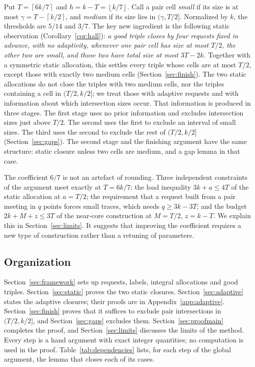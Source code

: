 \documentclass[11pt]{article}
\numberwithin{equation}{section}
\theoremstyle{definition}
\theoremstyle{remark}
\newcommand{\ceil}[1]{\left\lceil #1\right\rceil}
\newcommand{\floor}[1]{\left\lfloor #1\right\rfloor}
\begin{document}
Put $T=\ceil{6k/7}$ and $h=k-T=\floor{k/7}$. Call a pair cell
\emph{small} if its size is at most $\gamma=T-\ceil{k/2}$, and
\emph{medium} if its size lies in $(\gamma,T/2]$. Normalized by $k$, the
thresholds are $5/14$ and $3/7$. The key new ingredient is the
following static observation (Corollary~\ref{cor:hall}): \emph{a good
triple closes by four requests fixed in advance, with no adaptivity,
whenever one pair cell has size at most $T/2$, the other two are small,
and those two have total size at most $3T-2k$.} Together with a
symmetric static allocation, this settles every triple whose cells are
at most $T/2$, except those with exactly two medium cells
(Section~\ref{sec:finish}). The two static allocations do not close the
triples with two medium cells, nor the triples containing a cell in
$(T/2,k/2]$; we treat those with adaptive requests and with information
about which intersection sizes occur. That information is produced in
three stages. The first stage uses no prior
information and excludes intersection sizes just above $T/2$. The
second uses the first to exclude an interval of small sizes. The third
uses the second to exclude the rest of $(T/2,k/2]$
(Section~\ref{sec:gaps}). The second stage and the finishing argument
have the same structure: static closure unless two cells are medium,
and a gap lemma in that case.

The coefficient $6/7$ is not an artefact of rounding. Three independent
constraints of the argument meet exactly at $T=6k/7$: the load
inequality $3k+a\le4T$ of the static allocation at $a=T/2$; the
requirement that a request built from a pair meeting in $q$ points
forces small traces, which needs $q\ge3k-3T$; and the budget
$2k+M+z\le3T$ of the near-core construction at $M=T/2$, $z=k-T$. We
explain this in Section~\ref{sec:limits}. It suggests that improving
the coefficient requires a new type of construction rather than a
retuning of parameters.

\subsection*{Organization}
Section~\ref{sec:framework} sets up requests, labels, integral
allocations and good triples. Section~\ref{sec:static} proves the two
static closures. Section~\ref{sec:adaptive} states the adaptive
closures; their proofs are in Appendix~\ref{app:adaptive}.
Section~\ref{sec:finish} proves that it suffices to exclude pair
intersections in $(T/2,k/2]$, and Section~\ref{sec:gaps} excludes them.
Section~\ref{sec:proofmain} completes the proof, and
Section~\ref{sec:limits} discusses the limits of the method. Every step is a hand argument with exact integer quantities;
no computation is used in the proof.
Table~\ref{tab:dependencies} lists, for each step of the global
argument, the lemma that closes each of its cases.
\end{document}
